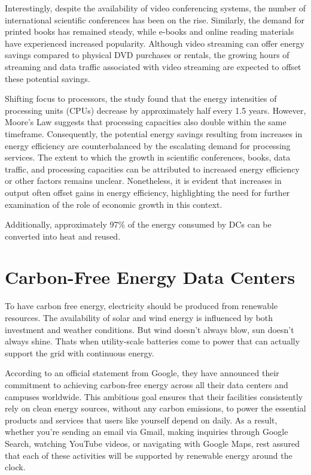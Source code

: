 \documentclass[
  a4paper,  %
  twoside,  %
  bibliography=totoc,
  headsepline,
  cleardoublepage=empty,
  parskip=half,
  draft=false
]{scrbook}
\begin{document}
Interestingly, despite the availability of video conferencing systems, the number of international scientific conferences has been on the rise. Similarly, the demand for printed books has remained steady, while e-books and online reading materials have experienced increased popularity. Although video streaming can offer energy savings compared to physical DVD purchases or rentals, the growing hours of streaming and data traffic associated with video streaming are expected to offset these potential savings.

Shifting focus to processors, the study found that the energy intensities of processing units (CPUs) decrease by approximately half every 1.5 years. However, Moore's Law suggests that processing capacities also double within the same timeframe. Consequently, the potential energy savings resulting from increases in energy efficiency are counterbalanced by the escalating demand for processing services. The extent to which the growth in scientific conferences, books, data traffic, and processing capacities can be attributed to increased energy efficiency or other factors remains unclear. Nonetheless, it is evident that increases in output often offset gains in energy efficiency, highlighting the need for further examination of the role of economic growth in this context.

Additionally, approximately 97\% of the energy consumed by DCs can be converted into heat and reused.

\section{Carbon-Free Energy Data Centers}

To have carbon free energy, electricity should be produced from renewable resources. The availability of solar and wind energy is influenced by both investment and weather conditions. But wind doesn't always blow, sun doesn't always shine. Thats when utility-scale batteries come to power that can actually support the grid with continuous energy.

According to an official statement from Google, they have announced their commitment to achieving carbon-free energy across all their data centers and campuses worldwide. This ambitious goal ensures that their facilities consistently rely on clean energy sources, without any carbon emissions, to power the essential products and services that users like yourself depend on daily. As a result, whether you're sending an email via Gmail, making inquiries through Google Search, watching YouTube videos, or navigating with Google Maps, rest assured that each of these activities will be supported by renewable energy around the clock\cite{google2020thirddecade}.
\end{document}
